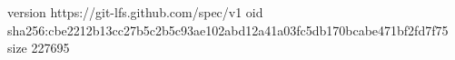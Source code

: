 version https://git-lfs.github.com/spec/v1
oid sha256:cbe2212b13cc27b5c2b5c93ae102abd12a41a03fc5db170bcabe471bf2fd7f75
size 227695
